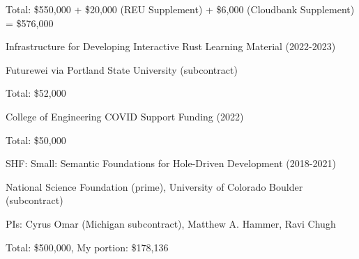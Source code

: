 \documentclass[10pt,letterpaper]{article}
\renewenvironment{itemize}{
  \begin{list}{}{
    \setlength{\leftmargin}{1.25em}
    \setlength{\itemsep}{0.25em}
    \setlength{\parskip}{0pt}
    \setlength{\parsep}{0.2em}
  }
}{
  \end{list}
}
\begin{document}
\begin{itemize}
\begin{itemize}
          \item Total: \$550,000 + \$20,000 (REU Supplement) + \$6,000 (Cloudbank Supplement) = \$576,000
        \end{itemize}
  \item Infrastructure for Developing Interactive Rust Learning Material (2022-2023)
        \begin{itemize}
          \item Futurewei via Portland State University (subcontract)
          \item Total: \$52,000
        \end{itemize}
  \item College of Engineering COVID Support Funding (2022)
        \begin{itemize}
          \item Total: \$50,000
        \end{itemize}
  \item SHF: Small: Semantic Foundations for Hole-Driven Development (2018-2021)
        \begin{itemize}
          \item National Science Foundation (prime), University of Colorado Boulder (subcontract)
          \item PIs: Cyrus Omar (Michigan subcontract), Matthew A. Hammer, Ravi Chugh
          \item Total: \$500,000, My portion: \$178,136
        \end{itemize}
\end{itemize}

\end{document}

